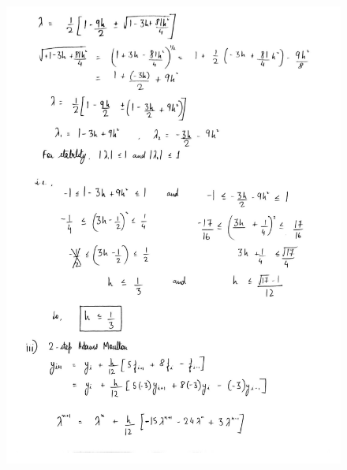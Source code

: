 \documentclass[12pt,letterpaper]{article}
\begin{document}
\begin{figure}[H]
\centering
\includegraphics[scale=0.55]{"../im2"}
\end{figure}
\end{document}
